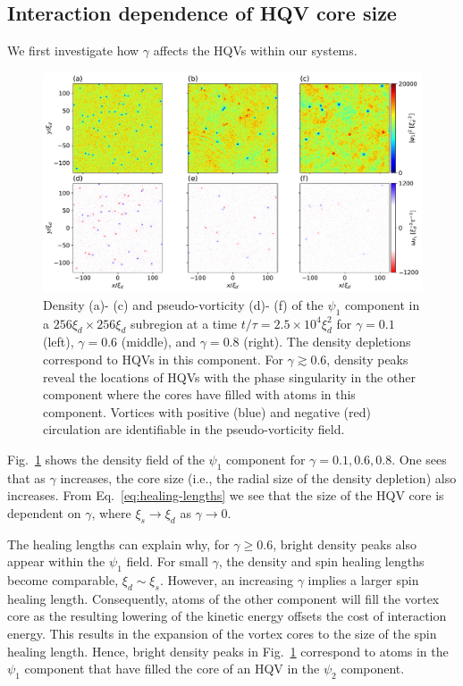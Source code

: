 \subsection{Interaction dependence of HQV core size}
We first investigate how \(\gamma \) affects the HQVs within our systems.
\begin{figure}
    \centering
    \includegraphics[width=\textwidth]{gfx/ch-twoCompDynamics/densVort.pdf}
    \caption[Density and pseudo-vorticity of at late simulation time for various
        \(\gamma \)]
    {\label{fig:density-pseudo-vort}Density (a)- (c) and pseudo-vorticity
        (d)- (f) of the \(\psi_1 \) component in a \(256\xi_d \times 256\xi_d\)
        subregion at a time \(t/\tau=2.5\times 10^4\xi_d^2\) for \(\gamma=0.1\)
        (left), \(\gamma=0.6\) (middle), and \(\gamma=0.8\) (right).
        The density depletions correspond to HQVs in this component.
        For \(\gamma \gtrsim 0.6\), density peaks reveal the locations of HQVs
        with the phase singularity in the other component where the cores have
        filled with atoms in this component.
        Vortices with positive (blue) and negative (red) circulation are
        identifiable in the pseudo-vorticity field.}
\end{figure}
Fig.~\ref{fig:density-pseudo-vort} shows the density field of the \(\psi_1 \)
component for \(\gamma = 0.1, 0.6, 0.8\).
One sees that as \(\gamma \) increases, the core size (i.e., the radial size of
the density depletion) also increases.
From Eq.~\eqref{eq:healing-lengths} we see that the size of the HQV core is
dependent on \(\gamma \), where \(\xi_s \rightarrow \xi_d\) as
\(\gamma \rightarrow 0\).

The healing lengths can explain why, for \(\gamma \geq 0.6\), bright density
peaks also appear within the \(\psi_1 \) field.
For small \(\gamma \), the density and spin healing lengths become comparable,
\(\xi_d \sim \xi_s\).
However, an increasing \(\gamma \) implies a larger spin healing length.
Consequently, atoms of the other component will fill the vortex core as the
resulting lowering of the kinetic energy offsets the cost of interaction energy.
This results in the expansion of the vortex cores to the size of the spin
healing length.
Hence, bright density peaks in Fig.~\ref{fig:density-pseudo-vort} correspond to
atoms in the \(\psi_1 \) component that have filled the core of an HQV in the
\(\psi_2\) component.

